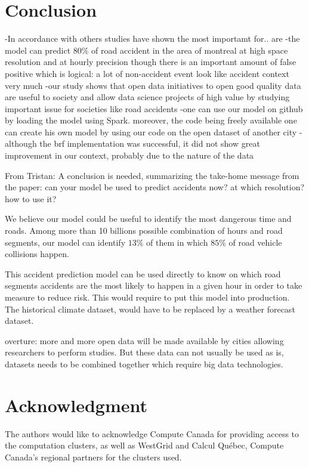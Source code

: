 \documentclass[conference]{IEEEtran}
\newcommand{\TG}[1]{\colorlet{saved}{.}\color{orange}From Tristan: #1\color{saved}}
\begin{document}
\section*{Conclusion}
-In accordance with others studies have shown the most importamt for.. are
-the model can predict 80\% of road accident in the area of montreal at high space resolution and at hourly precision though there is an important amount of false positive which is logical: a lot of non-accident event look like accident context very much 
-our study shows that open data initiatives to open good quality data are useful to society and allow data science projects of high value by studying important issue for societies like road accidents  
-one can use our model on github by loading the model using Spark. moreover, the code being freely available one can create his own model by using our code on the open dataset of another city 
-although the brf implementation was successful, it did not show great improvement in our context, probably due to the nature of the data

\TG{A conclusion is needed, summarizing the take-home message from the paper:
can your model be used to predict accidents now? at which resolution? how to use it?}

We believe our model could be useful to identify the most dangerous
time and roads. Among more than 10 billions possible combination of
hours and road segments, our model can identify $13\%$ of them in which
$85\%$ of road vehicle collisions happen.

This accident prediction model
can be used directly to know on which road segments accidents are the most
likely to happen in a given hour in order to take measure to reduce risk.
This would require to put this model into production. The historical
climate dataset, would have to be replaced by a weather forecast dataset.

overture: more and more open data will be made available by cities allowing researchers 
to perform studies. But these data can not usually be used as is, datasets needs to be combined
together which require big data technologies.

\section*{Acknowledgment}

The authors would like to acknowledge Compute Canada for providing access to the computation clusters, as well as WestGrid and Calcul Québec, Compute Canada's regional partners for the clusters used.



\end{document}
